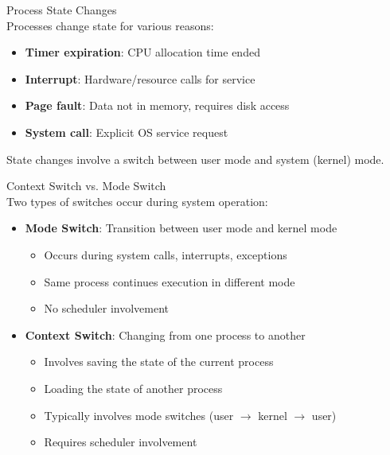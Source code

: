 \begin{definition}{Process State Changes}\\
    Processes change state for various reasons:
    \begin{itemize}
        \item \textbf{Timer expiration}: CPU allocation time ended
        \item \textbf{Interrupt}: Hardware/resource calls for service
        \item \textbf{Page fault}: Data not in memory, requires disk access
        \item \textbf{System call}: Explicit OS service request
    \end{itemize}
    
    State changes involve a switch between user mode and system (kernel) mode.
\end{definition}

\begin{concept}{Context Switch vs. Mode Switch}\\
    Two types of switches occur during system operation:
    \begin{itemize}
        \item \textbf{Mode Switch}: Transition between user mode and kernel mode
            \begin{itemize}
                \item Occurs during system calls, interrupts, exceptions
                \item Same process continues execution in different mode
                \item No scheduler involvement
            \end{itemize}
        \item \textbf{Context Switch}: Changing from one process to another
            \begin{itemize}
                \item Involves saving the state of the current process
                \item Loading the state of another process
                \item Typically involves mode switches (user $\rightarrow$ kernel $\rightarrow$ user)
                \item Requires scheduler involvement
            \end{itemize}
    \end{itemize}
\end{concept}

